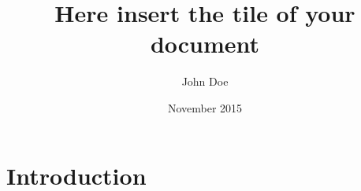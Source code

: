 \documentclass{article}
\title{Here insert the tile of your document}
\author{John Doe}
\date{November 2015}
\begin{document}
\maketitle

\section{Introduction}
\end{document}
